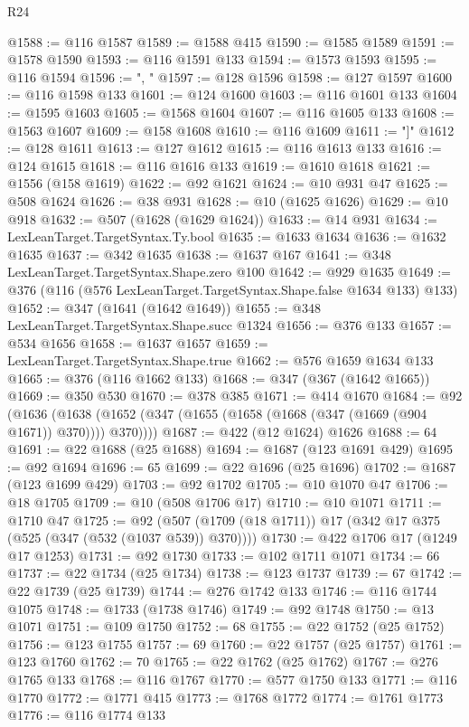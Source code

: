 \begin{lexlean}{R24}
\begin{coremodule}
{{{{{{{{{{{{{{{{{{{{{{{{{{{{{{{{{{{{{{{{{{{{{{{{{{{{{{{{{{{{{{{{{{{{{{{{{{{{{{{{{{{{{{{{{{{{{{{{{{{{{{{{{{{{{{{{{{{{{{{{{{{{{{{{{{{{{{{{{{{{{{{{{{{{{{{{{{{{{{{{{{{{{{{{{{{{{{{{{{{{{{{{{{{{{{{{{{{@1588 := @116 @1587
@1589 := @1588 @415
@1590 := @1585 @1589
@1591 := @1578 @1590
@1593 := @116 @1591 @133
@1594 := @1573 @1593
@1595 := @116 @1594
@1596 := ", "
@1597 := @128 @1596
@1598 := @127 @1597
@1600 := @116 @1598 @133
@1601 := @124 @1600
@1603 := @116 @1601 @133
@1604 := @1595 @1603
@1605 := @1568 @1604
@1607 := @116 @1605 @133
@1608 := @1563 @1607
@1609 := @158 @1608
@1610 := @116 @1609
@1611 := "]"
@1612 := @128 @1611
@1613 := @127 @1612
@1615 := @116 @1613 @133
@1616 := @124 @1615
@1618 := @116 @1616 @133
@1619 := @1610 @1618
@1621 := @1556 (@158 @1619)
@1622 := @92 @1621
@1624 := @10 @931 @47
@1625 := @508 @1624
@1626 := @38 @931
@1628 := @10 (@1625 @1626)
@1629 := @10 @918
@1632 := @507 (@1628 (@1629 @1624))
@1633 := @14 @931
@1634 := LexLeanTarget.TargetSyntax.Ty.bool
@1635 := @1633 @1634
@1636 := @1632 @1635
@1637 := @342 @1635
@1638 := @1637 @167
@1641 := @348 LexLeanTarget.TargetSyntax.Shape.zero @100
@1642 := @929 @1635
@1649 := @376 (@116 (@576 LexLeanTarget.TargetSyntax.Shape.false @1634 @133) @133)
@1652 := @347 (@1641 (@1642 @1649))
@1655 := @348 LexLeanTarget.TargetSyntax.Shape.succ @1324
@1656 := @376 @133
@1657 := @534 @1656
@1658 := @1637 @1657
@1659 := LexLeanTarget.TargetSyntax.Shape.true
@1662 := @576 @1659 @1634 @133
@1665 := @376 (@116 @1662 @133)
@1668 := @347 (@367 (@1642 @1665))
@1669 := @350 @530
@1670 := @378 @385
@1671 := @414 @1670
@1684 := @92
    (@1636 (@1638 (@1652 (@347 (@1655 (@1658 (@1668 (@347 (@1669 (@904 @1671)) @370)))) @370))))
@1687 := @422 (@12 @1624) @1626
@1688 := 64
@1691 := @22 @1688 (@25 @1688)
@1694 := @1687 (@123 @1691 @429)
@1695 := @92 @1694
@1696 := 65
@1699 := @22 @1696 (@25 @1696)
@1702 := @1687 (@123 @1699 @429)
@1703 := @92 @1702
@1705 := @10 @1070 @47
@1706 := @18 @1705
@1709 := @10 (@508 @1706 @17)
@1710 := @10 @1071
@1711 := @1710 @47
@1725 := @92 (@507 (@1709 (@18 @1711)) @17 (@342 @17 @375 (@525 (@347 (@532 (@1037 @539)) @370))))
@1730 := @422 @1706 @17 (@1249 @17 @1253)
@1731 := @92 @1730
@1733 := @102 @1711 @1071
@1734 := 66
@1737 := @22 @1734 (@25 @1734)
@1738 := @123 @1737
@1739 := 67
@1742 := @22 @1739 (@25 @1739)
@1744 := @276 @1742 @133
@1746 := @116 @1744 @1075
@1748 := @1733 (@1738 @1746)
@1749 := @92 @1748
@1750 := @13 @1071
@1751 := @109 @1750
@1752 := 68
@1755 := @22 @1752 (@25 @1752)
@1756 := @123 @1755
@1757 := 69
@1760 := @22 @1757 (@25 @1757)
@1761 := @123 @1760
@1762 := 70
@1765 := @22 @1762 (@25 @1762)
@1767 := @276 @1765 @133
@1768 := @116 @1767
@1770 := @577 @1750 @133
@1771 := @116 @1770
@1772 := @1771 @415
@1773 := @1768 @1772
@1774 := @1761 @1773
@1776 := @116 @1774 @133
}}}}}}}}}}}}}}}}}}}}}}}}}}}}}}}}}}}}}}}}}}}}}}}}}}}}}}}}}}}}}}}}}}}}}}}}}}}}}}}}}}}}}}}}}}}}}}}}}}}}}}}}}}}}}}}}}}}}}}}}}}}}}}}}}}}}}}}}}}}}}}}}}}}}}}}}}}}}}}}}}}}}}}}}}}}}}}}}}}}}}}}}}}}}}}}}}}}
\end{coremodule}
\end{lexlean}
